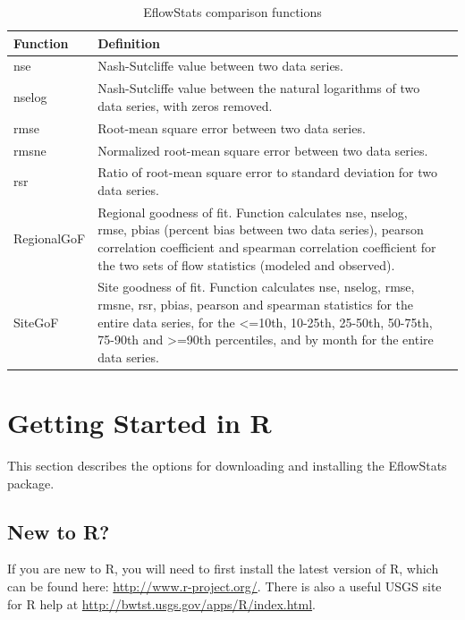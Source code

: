 \documentclass[a4paper,11pt]{article}\usepackage[]{graphicx}\usepackage[]{color}
\begin{document}
\begin{table}[ht]
  \centering
  \begin{threeparttable}[b]
  \caption{EflowStats comparison functions}
  \label{tab:compStats}
\begin{tabularx}{\textwidth}{lXl}
  \hline
\textbf{Function} & \textbf{Definition} \\ 
  \hline
  nse & Nash-Sutcliffe value between two data series. \\
  nselog & Nash-Sutcliffe value between the natural logarithms of two data series, with zeros removed. \\
  rmse & Root-mean square error between two data series. \\
  rmsne & Normalized root-mean square error between two data series. \\
  rsr & Ratio of root-mean square error to standard deviation for two data series. \\
  RegionalGoF & Regional goodness of fit. Function calculates nse, nselog, rmse, pbias (percent bias between two data series), pearson correlation coefficient and spearman correlation coefficient for the two sets of flow statistics (modeled and observed). \\
  SiteGoF & Site goodness of fit. Function calculates nse, nselog, rmse, rmsne, rsr, pbias, pearson and  spearman statistics for the entire data series, for the <=10th, 10-25th, 25-50th, 50-75th, 75-90th and >=90th percentiles, and by month for the entire data series. \\
   \hline
\end{tabularx}
\end{threeparttable}
\end{table}

\FloatBarrier
\clearpage

\section{Getting Started in R}
\label{sec:started}
This section describes the options for downloading and installing the EflowStats package.

\subsection{New to R?}
If you are new to R, you will need to first install the latest version of R, which can be found here: \url{http://www.r-project.org/}. There is also a useful USGS site for R help at \url{http://bwtst.usgs.gov/apps/R/index.html}.
\end{document}
